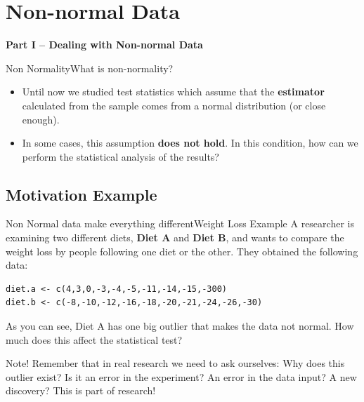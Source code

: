 


\section{Non-normal Data}

\begin{frame}
  \begin{center}
    {\bf Part I -- Dealing with Non-normal Data}
  \end{center}
\end{frame}

\begin{frame}{Non Normality}{What is non-normality?}
  \begin{itemize}
    \item Until now we studied test statistics which assume that the {\bf estimator} calculated from the sample comes from a normal distribution (or close enough).\bigskip
    \item In some cases, this assumption {\bf does not hold}. In this condition,
      how can we perform the statistical analysis of the results?
  \end{itemize}
\end{frame}

\subsection{Motivation Example}

\begin{frame}[fragile]{Non Normal data make everything different}{Weight Loss Example}
A researcher is examining two different diets, {\bf Diet A} and {\bf Diet B},
and wants to compare the weight loss by people following one diet or the other.
They obtained the following data:

\begin{verbatim}
diet.a <- c(4,3,0,-3,-4,-5,-11,-14,-15,-300)
diet.b <- c(-8,-10,-12,-16,-18,-20,-21,-24,-26,-30)
\end{verbatim}
\bigskip

As you can see, Diet A has one big outlier that makes the data not normal. How much does this affect the statistical test?\bigskip

{\smaller
\begin{block}{Note!}
  Remember that in real research we need to ask ourselves: Why does this outlier exist? Is it an error in the experiment? An error in the data input? A new discovery? This is part of research!
\end{block}}

\end{frame}

